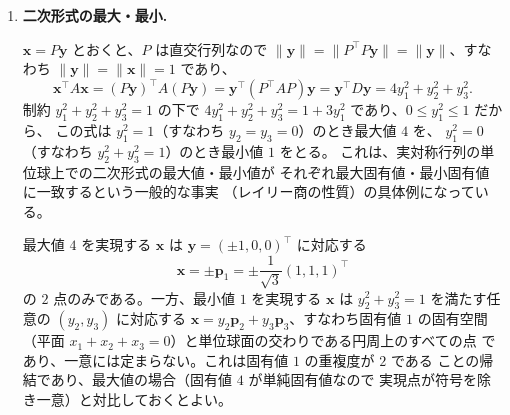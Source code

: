 \begin{enumerate}
    前問の $\bm{p}_1,\bm{p}_2,\bm{p}_3$ を並べた行列
    \[
      P =
      \begin{pmatrix}
        \dfrac{1}{\sqrt{3}} & \dfrac{1}{\sqrt{2}} & \dfrac{1}{\sqrt{6}} \\[6pt]
        \dfrac{1}{\sqrt{3}} & -\dfrac{1}{\sqrt{2}} & \dfrac{1}{\sqrt{6}} \\[6pt]
        \dfrac{1}{\sqrt{3}} & 0 & -\dfrac{2}{\sqrt{6}}
      \end{pmatrix}
    \]
    は正規直交基底を列に並べた行列なので直交行列（$P^{\top}P=I$）である。
    実際、各列の長さが $1$ であること、および
    $\bm{p}_1\cdot\bm{p}_2 = 0$, $\bm{p}_1\cdot\bm{p}_3
    = \tfrac{1}{\sqrt{18}}(1+1-2)=0$, $\bm{p}_2\cdot\bm{p}_3=0$
    であることから確認できる。このとき
    \[
      P^{\top} A P = D, \qquad
      D = \begin{pmatrix} 4 & 0 & 0 \\ 0 & 1 & 0 \\ 0 & 0 & 1 \end{pmatrix}
    \]
    が成り立つ。

  \item \textbf{二次形式の最大・最小.}

    $\bm{x} = P\bm{y}$ とおくと、$P$ は直交行列なので
    $\|\bm{y}\| = \|P^{\top}P\bm{y}\| = \|\bm{y}\|$、すなわち
    $\|\bm{y}\|=\|\bm{x}\|=1$ であり、
    \[
      \bm{x}^{\top}A\bm{x}
      = (P\bm{y})^{\top}A(P\bm{y})
      = \bm{y}^{\top}(P^{\top}AP)\bm{y}
      = \bm{y}^{\top}D\bm{y}
      = 4y_1^2+y_2^2+y_3^2.
    \]
    制約 $y_1^2+y_2^2+y_3^2=1$ の下で
    $4y_1^2+y_2^2+y_3^2 = 1+3y_1^2$ であり、$0\le y_1^2\le1$ だから、
    この式は $y_1^2=1$（すなわち $y_2=y_3=0$）のとき最大値 $4$ を、
    $y_1^2=0$（すなわち $y_2^2+y_3^2=1$）のとき最小値 $1$ をとる。
    これは、実対称行列の単位球上での二次形式の最大値・最小値が
    それぞれ最大固有値・最小固有値に一致するという一般的な事実
    （レイリー商の性質）の具体例になっている。

    最大値 $4$ を実現する $\bm{x}$ は $\bm{y}=(\pm1,0,0)^{\top}$ に対応する
    \[
      \bm{x} = \pm\bm{p}_1 = \pm\frac{1}{\sqrt3}(1,1,1)^{\top}
    \]
    の $2$ 点のみである。一方、最小値 $1$ を実現する $\bm{x}$ は
    $y_2^2+y_3^2=1$ を満たす任意の $(y_2,y_3)$ に対応する
    $\bm{x} = y_2\bm{p}_2+y_3\bm{p}_3$、すなわち固有値 $1$ の固有空間
    （平面 $x_1+x_2+x_3=0$）と単位球面の交わりである円周上のすべての点
    であり、一意には定まらない。これは固有値 $1$ の重複度が $2$ である
    ことの帰結であり、最大値の場合（固有値 $4$ が単純固有値なので
    実現点が符号を除き一意）と対比しておくとよい。


\end{enumerate}
